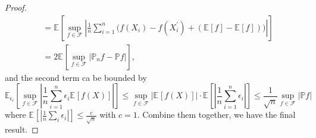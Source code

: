 \begin{proof}
\[\begin{split}
			&= \mathbb{E}_{}\left[\sup _{f\in \mathscr{F} } \left\vert \frac{1}{n}\sum_{i=1}^{n} \big( f(X_i) - f(X_i^{\prime} ) + (\mathbb{E}_{}\left[f \right] - \mathbb{E}_{}\left[f \right] ) \big) \right\vert  \right]\\
			&= 2 \mathbb{E}_{}\left[\sup _{f\in \mathscr{F} } \left\vert \mathbb{P} _n f - \mathbb{P} f \right\vert  \right] ,
		\end{split}
	\]
	and the second term ca be bounded by
	\[
		\mathbb{E}_{\epsilon _i}\left[\sup _{f\in \mathscr{F} } \left\vert \frac{1}{n}\sum_{i=1}^{n} \epsilon _i \mathbb{E}_{}\left[f(X) \right] \right\vert \right]
		\leq \sup _{f\in \mathscr{F} } \left\vert \mathbb{E}_{}\left[f(X) \right]  \right\vert \cdot \mathbb{E}_{}\left[\left\vert \frac{1}{n} \sum_{i=1}^{n} \epsilon _i \right\vert \right]
		\leq \frac{1}{\sqrt{n} } \sup _{f\in \mathscr{F} } \vert \mathbb{P} f \vert
	\]
	where \(\mathbb{E}_{}\left[\left\vert \frac{1}{n} \sum_{i} \epsilon _i \right\vert \right] \leq \frac{c}{\sqrt{n} } \) with \(c = 1\). Combine them together, we have the final result.
\end{proof}